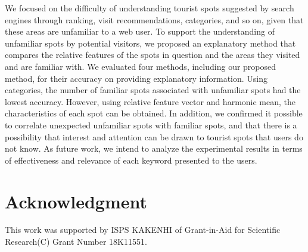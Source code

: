 \documentclass[journal]{IAENGtran}
\begin{document}
   We focused on the difficulty of understanding tourist spots suggested by search engines through ranking, visit recommendations, categories, and so on, given that these areas are unfamiliar to a web user. To support the understanding of unfamiliar spots by potential visitors, we proposed an explanatory method that compares the relative features of the spots in question and the areas they visited and are familiar with.
   We evaluated four methods, including our proposed method, for their accuracy on providing explanatory information. Using categories, the number of familiar spots associated with unfamiliar spots had the lowest accuracy. However, using relative feature vector and harmonic mean, the characteristics of each spot can be obtained. In addition, we confirmed it possible to correlate unexpected unfamiliar spots with familiar spots, and that there is a possibility that interest and attention can be drawn to tourist spots that users do not know.
   As future work, we intend to analyze the experimental results in terms of effectiveness and relevance of each keyword presented to the users.

\section*{Acknowledgment}
This work was supported by ISPS KAKENHI of Grant-in-Aid for Scientific Research(C) Grant Number 18K11551.

\ifCLASSOPTIONcaptionsoff
  \newpage
\fi
\end{document}

